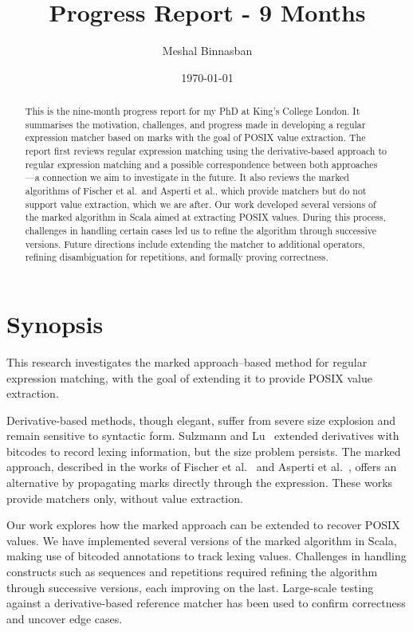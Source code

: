 \documentclass[12pt]{article}
\title{Progress Report - 9 Months}
\author{Meshal Binnasban}
\date{\today}
\begin{document}
\maketitle


\begin{abstract}
This is the nine-month progress report for my PhD at King’s College London. It summarises the motivation,
challenges, and progress made in developing a regular expression matcher based on marks with the goal
of POSIX value extraction. The report first reviews regular expression matching using the derivative-based approach to regular expression
matching and a possible correspondence between both approaches —a connection we aim to investigate in 
the future. It also reviews the marked algorithms of Fischer et al.\ and Asperti et al., which provide 
matchers but do not support value extraction, which we are after. Our work developed several versions 
of the marked algorithm in Scala aimed at extracting POSIX values. During this process, challenges in
handling certain cases led us to refine the algorithm through successive versions.  
Future directions include extending the matcher to additional operators, refining disambiguation for 
repetitions, and formally proving correctness.  
\end{abstract}


\newpage

\section*{Synopsis}
This research investigates the marked approach--based method for regular expression 
matching, with the goal of extending it to provide POSIX value extraction.

Derivative-based methods, though elegant, suffer from severe size explosion and remain sensitive to syntactic form.  
Sulzmann and Lu~\cite{Sulzmann2014} extended derivatives with bitcodes to record lexing information, but the size problem persists.  
The marked approach, described in the works of Fischer et al.~\cite{Fischer2010} and Asperti et al.~\cite{Asperti2010}, offers an alternative by propagating marks directly through the expression.  
These works provide matchers only, without value extraction.  

Our work explores how the marked approach can be extended to recover POSIX values.  
We have implemented several versions of the marked algorithm in Scala, making use of bitcoded annotations to track lexing values.  
Challenges in handling constructs such as sequences and repetitions required refining the algorithm through successive versions, each improving on the last.  
Large-scale testing against a derivative-based reference matcher has been used to confirm correctness and uncover edge cases.  
\end{document}
